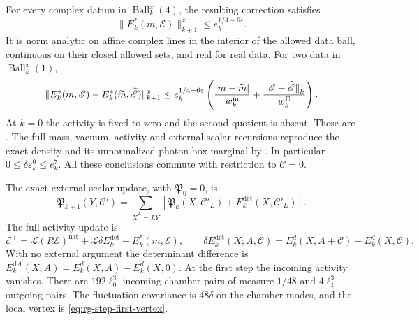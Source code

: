 For every complex datum in \(\operatorname{Ball}_k^x(4)\), the resulting
correction satisfies
\[
 \|E_k^*(m,\mathscr E)\|_{k+1}^x\le e_k^{1/4-6\varepsilon}.
\]
It is norm analytic on affine complex lines in the interior of the
allowed data ball, continuous on their closed allowed sets, and real
for real data. For two data in \(\operatorname{Ball}_k^x(1)\),
\[
 \|E_k^*(m,\mathscr E)-E_k^*(\widetilde m,\widetilde{\mathscr E})\|_{k+1}^x
 \le e_k^{1/4-6\varepsilon}
 \left(\frac{|m-\widetilde m|}{w_k^{\rm m}}
       +\frac{\|\mathscr E-\widetilde{\mathscr E}\|_k^x}{w_k^{\rm E}}\right).
\]
At \(k=0\) the activity is fixed to zero and the second quotient is
absent. These are \cite[Proposition 8.1]{NonlinearStep}.
The full mass, vacuum, activity and external-scalar recursions reproduce
the exact density and its unnormalized photon-box marginal by
\cite[Theorem A]{NonlinearStep}.
In particular \(0\le\delta\varepsilon_k^0\le e_k^7\).
All these conclusions commute with restriction to \(\mathscr C=0\).


The exact external scalar update, with $\mathfrak P_0=0$, is
\begin{equation}\label{eq:rgnl-external-scalar-map}
 \mathfrak P_{k+1}(Y,\mathscr C')
  =\sum_{\bar X^L=LY}
       [\mathfrak P_k(X,\mathscr C'_L)+E_k^{\mathrm{det}}(X,\mathscr C'_L)].
\end{equation}
The full activity update is
\[
 \mathscr E^+=\mathcal L(R\mathscr E)^{\mathrm{nat}}
                +\mathcal L\delta E_k^{\mathrm{det}}+E_k^*(m,\mathscr E),
 \qquad
 \delta E_k^{\mathrm{det}}(X;A,\mathscr C)
       =E_k^d(X,A+\mathscr C)-E_k^d(X,\mathscr C).
\]
With no external argument the determinant difference is
$E_k^{\mathrm{det}}(X,A)=E_k^d(X,A)-E_k^d(X,0)$.
At the first step the incoming activity vanishes. There are
$192\ell_0^3$ incoming chamber pairs of measure $1/48$ and
$4\ell_1^3$ outgoing pairs. The fluctuation covariance is $48\delta$
on the chamber modes, and the local vertex is
\eqref{eq:rg-step-first-vertex}.
